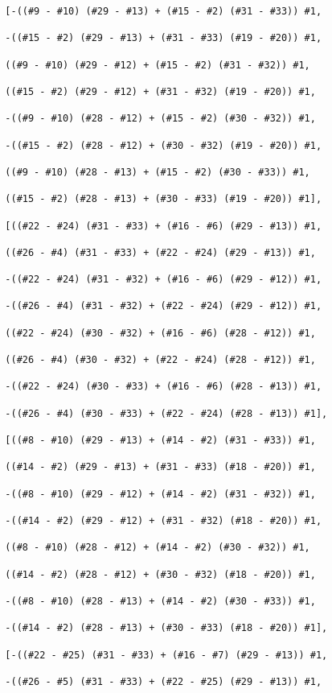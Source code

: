 \documentclass[../main.tex]{subfiles}
\begin{document}
\begin{verbatim}
  [-((#9 - #10) (#29 - #13) + (#15 - #2) (#31 - #33)) #1, 
  
  -((#15 - #2) (#29 - #13) + (#31 - #33) (#19 - #20)) #1,

  ((#9 - #10) (#29 - #12) + (#15 - #2) (#31 - #32)) #1, 
  
  ((#15 - #2) (#29 - #12) + (#31 - #32) (#19 - #20)) #1,

  -((#9 - #10) (#28 - #12) + (#15 - #2) (#30 - #32)) #1, 
  
  -((#15 - #2) (#28 - #12) + (#30 - #32) (#19 - #20)) #1,

  ((#9 - #10) (#28 - #13) + (#15 - #2) (#30 - #33)) #1, 
  
  ((#15 - #2) (#28 - #13) + (#30 - #33) (#19 - #20)) #1],

  [((#22 - #24) (#31 - #33) + (#16 - #6) (#29 - #13)) #1, 
  
  ((#26 - #4) (#31 - #33) + (#22 - #24) (#29 - #13)) #1,

  -((#22 - #24) (#31 - #32) + (#16 - #6) (#29 - #12)) #1, 
  
  -((#26 - #4) (#31 - #32) + (#22 - #24) (#29 - #12)) #1,

  ((#22 - #24) (#30 - #32) + (#16 - #6) (#28 - #12)) #1, 
  
  ((#26 - #4) (#30 - #32) + (#22 - #24) (#28 - #12)) #1,

  -((#22 - #24) (#30 - #33) + (#16 - #6) (#28 - #13)) #1, 
  
  -((#26 - #4) (#30 - #33) + (#22 - #24) (#28 - #13)) #1],

  [((#8 - #10) (#29 - #13) + (#14 - #2) (#31 - #33)) #1, 
  
  ((#14 - #2) (#29 - #13) + (#31 - #33) (#18 - #20)) #1,

  -((#8 - #10) (#29 - #12) + (#14 - #2) (#31 - #32)) #1, 
  
  -((#14 - #2) (#29 - #12) + (#31 - #32) (#18 - #20)) #1,

  ((#8 - #10) (#28 - #12) + (#14 - #2) (#30 - #32)) #1, 
  
  ((#14 - #2) (#28 - #12) + (#30 - #32) (#18 - #20)) #1,

  -((#8 - #10) (#28 - #13) + (#14 - #2) (#30 - #33)) #1, 
  
  -((#14 - #2) (#28 - #13) + (#30 - #33) (#18 - #20)) #1],

  [-((#22 - #25) (#31 - #33) + (#16 - #7) (#29 - #13)) #1, 
  
  -((#26 - #5) (#31 - #33) + (#22 - #25) (#29 - #13)) #1,


\end{verbatim}
\end{document}
